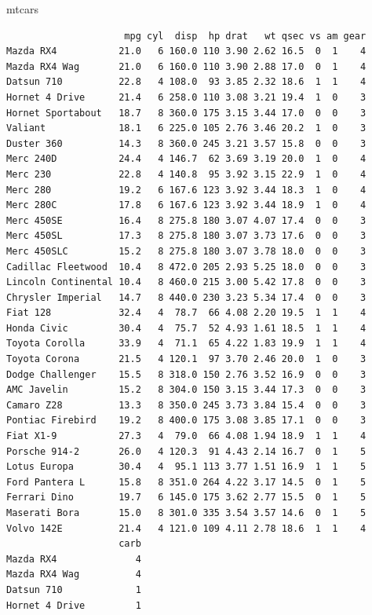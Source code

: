 \documentclass[]{book}
\newenvironment{Shaded}{\begin{snugshade}}{\end{snugshade}}
\newcommand{\NormalTok}[1]{#1}
\theoremstyle{definition}
\theoremstyle{definition}
\theoremstyle{definition}
\theoremstyle{remark}
\begin{document}
\begin{Shaded}
\begin{Highlighting}[]
\NormalTok{mtcars}
\end{Highlighting}
\end{Shaded}

\begin{verbatim}
                     mpg cyl  disp  hp drat   wt qsec vs am gear
Mazda RX4           21.0   6 160.0 110 3.90 2.62 16.5  0  1    4
Mazda RX4 Wag       21.0   6 160.0 110 3.90 2.88 17.0  0  1    4
Datsun 710          22.8   4 108.0  93 3.85 2.32 18.6  1  1    4
Hornet 4 Drive      21.4   6 258.0 110 3.08 3.21 19.4  1  0    3
Hornet Sportabout   18.7   8 360.0 175 3.15 3.44 17.0  0  0    3
Valiant             18.1   6 225.0 105 2.76 3.46 20.2  1  0    3
Duster 360          14.3   8 360.0 245 3.21 3.57 15.8  0  0    3
Merc 240D           24.4   4 146.7  62 3.69 3.19 20.0  1  0    4
Merc 230            22.8   4 140.8  95 3.92 3.15 22.9  1  0    4
Merc 280            19.2   6 167.6 123 3.92 3.44 18.3  1  0    4
Merc 280C           17.8   6 167.6 123 3.92 3.44 18.9  1  0    4
Merc 450SE          16.4   8 275.8 180 3.07 4.07 17.4  0  0    3
Merc 450SL          17.3   8 275.8 180 3.07 3.73 17.6  0  0    3
Merc 450SLC         15.2   8 275.8 180 3.07 3.78 18.0  0  0    3
Cadillac Fleetwood  10.4   8 472.0 205 2.93 5.25 18.0  0  0    3
Lincoln Continental 10.4   8 460.0 215 3.00 5.42 17.8  0  0    3
Chrysler Imperial   14.7   8 440.0 230 3.23 5.34 17.4  0  0    3
Fiat 128            32.4   4  78.7  66 4.08 2.20 19.5  1  1    4
Honda Civic         30.4   4  75.7  52 4.93 1.61 18.5  1  1    4
Toyota Corolla      33.9   4  71.1  65 4.22 1.83 19.9  1  1    4
Toyota Corona       21.5   4 120.1  97 3.70 2.46 20.0  1  0    3
Dodge Challenger    15.5   8 318.0 150 2.76 3.52 16.9  0  0    3
AMC Javelin         15.2   8 304.0 150 3.15 3.44 17.3  0  0    3
Camaro Z28          13.3   8 350.0 245 3.73 3.84 15.4  0  0    3
Pontiac Firebird    19.2   8 400.0 175 3.08 3.85 17.1  0  0    3
Fiat X1-9           27.3   4  79.0  66 4.08 1.94 18.9  1  1    4
Porsche 914-2       26.0   4 120.3  91 4.43 2.14 16.7  0  1    5
Lotus Europa        30.4   4  95.1 113 3.77 1.51 16.9  1  1    5
Ford Pantera L      15.8   8 351.0 264 4.22 3.17 14.5  0  1    5
Ferrari Dino        19.7   6 145.0 175 3.62 2.77 15.5  0  1    5
Maserati Bora       15.0   8 301.0 335 3.54 3.57 14.6  0  1    5
Volvo 142E          21.4   4 121.0 109 4.11 2.78 18.6  1  1    4
                    carb
Mazda RX4              4
Mazda RX4 Wag          4
Datsun 710             1
Hornet 4 Drive         1

\end{verbatim}
\end{document}
